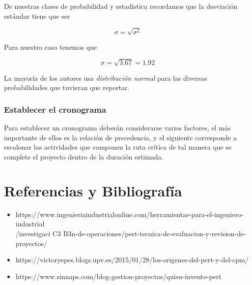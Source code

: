 \documentclass{mylib/reporteCorto}
\begin{document}

De nuestras clases de probabilidad y estadística recordamos que  la desviación estándar tiene que ser

$$\sigma = \sqrt{\sigma^2}$$

Para nuestro caso tenemos que

$$\sigma = \sqrt{3.67} = 1.92$$

La mayoría de los autores usa \textit{distribución normal} para las diversas probabilidades que tuvieran que reportar.

\subsubsection{Establecer el cronograma}

Para establecer un cronograma deberán considerarse varios factores, el más importante de ellos es la relación de precedencia, y el siguiente corresponde a escalonar las actividades que componen la ruta crítica de tal manera  que se complete el proyecto dentro de la duración estimada.


\section{Referencias y Bibliografía}

\begin{itemize}
	\item https://www.ingenieriaindustrialonline.com/herramientas-para-el-ingeniero-industrial\\/investigaci C3 B3n-de-operaciones/pert-tecnica-de-evaluacion-y-revision-de-proyectos/
	\item https://victoryepes.blogs.upv.es/2015/01/28/los-origenes-del-pert-y-del-cpm/
	\item https://www.sinnaps.com/blog-gestion-proyectos/quien-invento-pert

\end{itemize}
\end{document}
